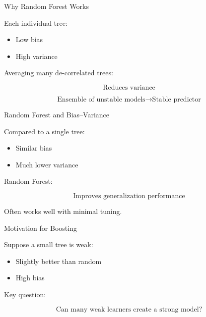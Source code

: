 \documentclass{beamer}
\begin{document}
\begin{frame}{Why Random Forest Works}

Each individual tree:

\begin{itemize}
    \item Low bias
    \item High variance
\end{itemize}

\vspace{0.4cm}

Averaging many de-correlated trees:

\[
\text{Reduces variance}
\]

\vspace{0.4cm}

\[
\text{Ensemble of unstable models} \rightarrow \text{Stable predictor}
\]

\end{frame}

\begin{frame}{Random Forest and Bias--Variance}

Compared to a single tree:

\begin{itemize}
    \item Similar bias
    \item Much lower variance
\end{itemize}

\vspace{0.5cm}

Random Forest:

\[
\text{Improves generalization performance}
\]

\vspace{0.3cm}

Often works well with minimal tuning.

\end{frame}

\begin{frame}{Motivation for Boosting}

Suppose a small tree is weak:

\begin{itemize}
    \item Slightly better than random
    \item High bias
\end{itemize}

\vspace{0.5cm}

Key question:

\[
\text{Can many weak learners create a strong model?}
\]

\end{frame}
\end{document}
